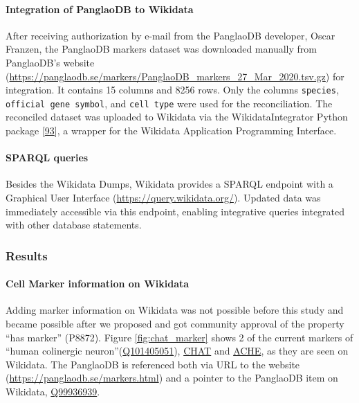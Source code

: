 \hypertarget{integration-of-panglaodb-to-wikidata}{%
\paragraph{Integration of PanglaoDB to Wikidata}\label{integration-of-panglaodb-to-wikidata}}

After receiving authorization by e-mail from the PanglaoDB developer, Oscar Franzen, the PanglaoDB markers dataset was downloaded manually from PanglaoDB's website (\url{https://panglaodb.se/markers/PanglaoDB_markers_27_Mar_2020.tsv.gz}) for integration. It contains 15 columns and 8256 rows. Only the columns \texttt{species}, \texttt{official\ gene\ symbol}, and \texttt{cell\ type} were used for the reconciliation.
The reconciled dataset was uploaded to Wikidata via the WikidataIntegrator Python package {[}\protect\hyperlink{ref-qDI8I4IJ}{93}{]}, a wrapper for the Wikidata Application Programming Interface.

\hypertarget{sparql-queries}{%
\paragraph{SPARQL queries}\label{sparql-queries}}

Besides the Wikidata Dumps, Wikidata provides a SPARQL endpoint with a Graphical User Interface (\url{https://query.wikidata.org/}).
Updated data was immediately accessible via this endpoint, enabling integrative queries integrated with other database statements.

\hypertarget{results}{%
\subsubsection{Results}\label{results}}

\hypertarget{cell-marker-information-on-wikidata}{%
\paragraph{Cell Marker information on Wikidata}\label{cell-marker-information-on-wikidata}}

Adding marker information on Wikidata was not possible before this study and became possible after we proposed and got community approval of the property ``has marker'' (P8872).
Figure \ref{fig:chat_marker} shows 2 of the current markers of ``human colinergic neuron''(\href{http://www.wikidata.org/entity/Q101405051}{Q101405051}), \href{http://www.wikidata.org/entity/Q14863671}{CHAT} and \href{http://www.wikidata.org/entity/Q407983}{ACHE}, as they are seen on Wikidata.
The PanglaoDB is referenced both via URL to the website (\url{https://panglaodb.se/markers.html}) and a pointer to the PanglaoDB item on Wikidata, \href{http://www.wikidata.org/entity/Q99936939}{Q99936939}.

